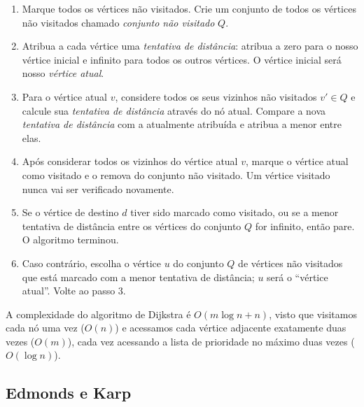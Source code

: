 \documentclass[12pt, a4]{article}
\begin{document}
\begin{enumerate}
\item Marque todos os vértices não visitados. Crie um conjunto de todos os
  vértices não visitados chamado \emph{conjunto não visitado} $Q$.

\item Atribua a cada vértice uma \emph{tentativa de distância}: atribua a zero
  para o nosso vértice inicial e infinito para todos os outros vértices. O
  vértice inicial será nosso \emph{vértice atual}.

\item Para o vértice atual $v$, considere todos os seus vizinhos não visitados
  $v' \in Q$ e calcule sua \emph{tentativa de distância} através do nó atual.
  Compare a nova \emph{tentativa de distância} com a atualmente atribuída e
  atribua a menor entre elas.

\item Após considerar todos os vizinhos do vértice atual $v$, marque o vértice
  atual como visitado e o remova do conjunto não visitado. Um vértice visitado
  nunca vai ser verificado novamente.

\item Se o vértice de destino $d$ tiver sido marcado como visitado, ou se a
  menor tentativa de distância entre os vértices do conjunto $Q$ for infinito,
  então pare. O algoritmo terminou.

\item Caso contrário, escolha o vértice $u$ do conjunto $Q$ de vértices não
  visitados que está marcado com a menor tentativa de distância; $u$ será o
  ``vértice atual''. Volte ao passo 3.
\end{enumerate}

A complexidade do algoritmo de Dijkstra é $O(m \log n + n)$, visto que visitamos
cada nó uma vez ($O(n)$) e acessamos cada vértice adjacente exatamente duas
vezes ($O(m)$), cada vez acessando a lista de prioridade no máximo duas vezes
($O(\log n)$).

\subsection{Edmonds e Karp}
\label{subsec:edmonds-karp}
\end{document}
